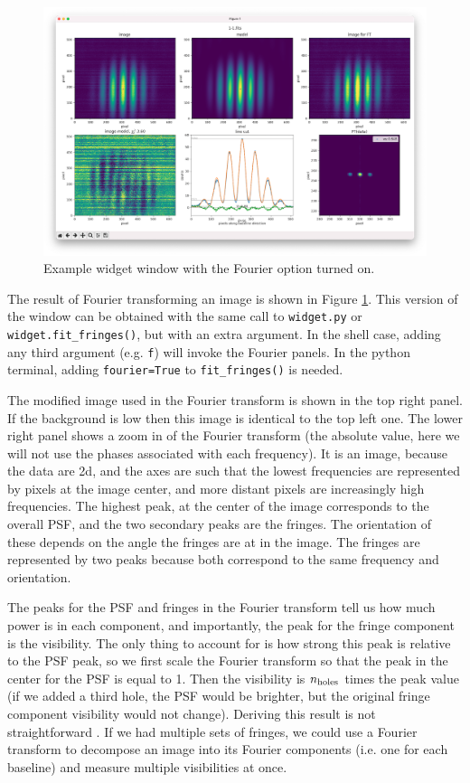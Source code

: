\documentclass[11pt]{article}
\begin{document}
\begin{figure}[h]
    \centering
   \includegraphics[width=1\textwidth]{widget-fourier.png}
    \caption{Example widget window with the Fourier option turned on.}
    \label{fig:widget-f}
\end{figure}

The result of Fourier transforming an image is shown in Figure \ref{fig:widget-f}. This version of the window can be obtained with the same call to \texttt{widget.py} or \texttt{widget.fit\_fringes()}, but with an extra argument. In the shell case, adding any third argument (e.g. \texttt{f}) will invoke the Fourier panels. In the python terminal, adding \texttt{fourier=True} to \texttt{fit\_fringes()} is needed.

The modified image used in the Fourier transform is shown in the top right panel. If the background is low then this image is identical to the top left one. The lower right panel shows a zoom in of the Fourier transform (the absolute value, here we will not use the phases associated with each frequency). It is an image, because the data are 2d, and the axes are such that the lowest frequencies are represented by pixels at the image center, and more distant pixels are increasingly high frequencies. The highest peak, at the center of the image corresponds to the overall PSF, and the two secondary peaks are the fringes. The orientation of these depends on the angle the fringes are at in the image. The fringes are represented by two peaks because both correspond to the same frequency and orientation.

The peaks for the PSF and fringes in the Fourier transform tell us how much power is in each component, and importantly, the peak for the fringe component is the visibility. The only thing to account for is how strong this peak is relative to the PSF peak, so we first scale the Fourier transform so that the peak in the center for the PSF is equal to 1. Then the visibility is $n_{\rm holes}$ times the peak value (if we added a third hole, the PSF would be brighter, but the original fringe component visibility would not change). Deriving this result is not straightforward \citep[e.g.][section 2.4.3]{2011psi..book.....G}. If we had multiple sets of fringes, we could use a Fourier transform to decompose an image into its Fourier components (i.e. one for each baseline) and measure multiple visibilities at once.
\end{document}
